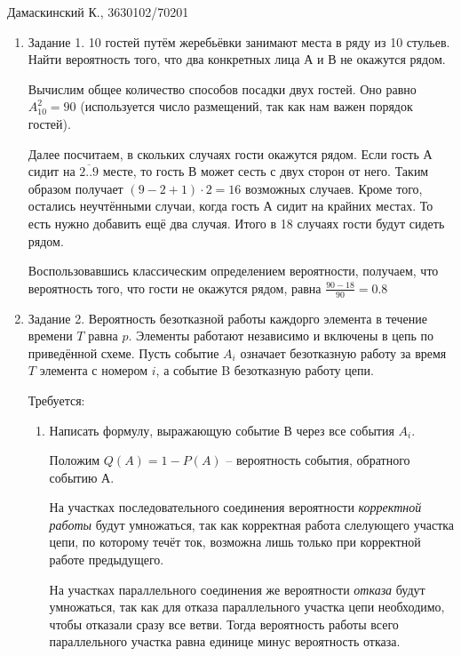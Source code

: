 


\begin{flushright}\large Дамаскинский К., 3630102/70201\end{flushright}

\begin{enumerate}
\item{Задание 1.}
10 гостей путём жеребьёвки занимают места в ряду из 10 стульев. Найти вероятность того, что два конкретных лица А и В не окажутся рядом.

Вычислим общее количество способов посадки двух гостей. Оно равно $ A_{10}^2 = 90 $ (используется число размещений, так как нам важен порядок
гостей).

Далее посчитаем, в скольких случаях гости окажутся рядом. Если гость А сидит на $\overline{2..9}$ месте, то гость В может сесть с двух сторон от него. Таким образом получает $(9 - 2 + 1) \cdot 2 = 16$ возможных случаев. Кроме того, остались неучтёнными случаи, когда гость А сидит на крайних местах. То есть нужно добавить ещё два случая. Итого в 18 случаях гости будут сидеть рядом.

Воспользовавшись классическим определением вероятности, получаем, что вероятность того, что гости не окажутся рядом, равна $\frac{90-18}{90}=0.8$

\item{Задание 2}. Вероятность безотказной работы каждорго элемента в течение времени $T$ равна $p$. Элементы работают независимо и включены в цепь по приведённой схеме. Пусть событие $A_i$ означает безотказную работу за время $T$ элемента с номером $i$, а событие B безотказную работу цепи.

Требуется:
\begin{enumerate}
\item{} Написать формулу, выражающую событие В через все события $A_i$.

Положим $Q(A) = 1 - P(A)$ -- вероятность события, обратного событию А.

На участках последовательного соединения вероятности \textit{корректной работы} будут умножаться, так как корректная работа слелующего участка цепи, по которому течёт ток, возможна лишь только при корректной работе предыдущего.

На участках параллельного соединения же вероятности \textit{отказа} будут умножаться, так как для отказа параллельного участка цепи необходимо, чтобы отказали сразу все ветви. Тогда вероятность работы всего параллельного участка равна единице минус вероятность отказа.


\end{enumerate}
\end{enumerate}
